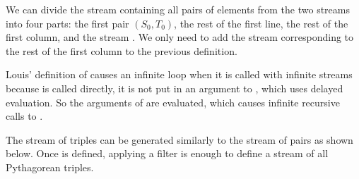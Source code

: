 \begin{exe}[3.67]
    We can divide the stream  containing all pairs of 
    elements from the two streams into four parts: the first pair $(S_0, T_0)$, 
    the rest of the first line, the rest of the first column, and the stream
    . We only need to add the 
    stream corresponding to the rest of the first column to the previous 
    definition.
\end{exe}

\begin{exe}[3.68]
    Louis’ definition of  causes an infinite loop when it is called 
    with infinite streams because  is called directly, it is 
    not put in an argument to , which uses delayed evaluation. 
    So the arguments of  are evaluated, which causes infinite 
    recursive calls to .
\end{exe}

\begin{exe}[3.69]
    The stream of triples can be generated similarly to the stream of pairs as 
    shown below. Once  is defined, applying a filter is enough to 
    define a stream of all Pythagorean triples.
\end{exe}
